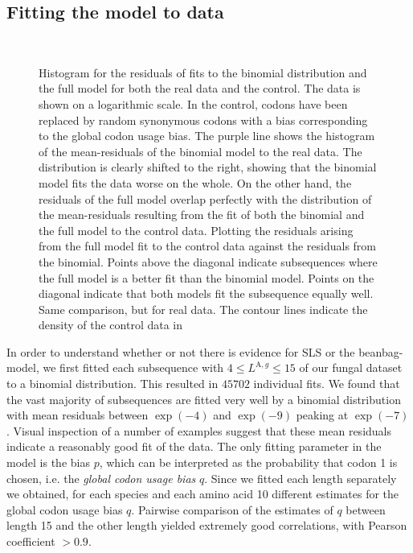\documentclass[a4paper,10pt]{paper}%
\begin{document}
\subsection{Fitting the model to data}
%
%
\begin{figure}
\centering
{}\\
\caption{ \protect{}  Histogram for the residuals  of fits to the binomial distribution and the full model for both the real data and the control. The data is shown on a logarithmic scale.  In the  control, codons have been replaced by random synonymous codons with a bias corresponding to the global codon usage bias.  The purple line shows the histogram of the mean-residuals of the binomial model to the real data.  The distribution is clearly shifted to the right, showing that  the binomial model fits the data  worse on the whole. On the other hand, the  residuals of the full model overlap perfectly with the distribution of the mean-residuals resulting from the fit  of both the binomial and the full model to the control data.  \protect{} Plotting the residuals arising from the full model fit to the control data against the residuals from the binomial. Points above the diagonal indicate subsequences where the full model is a better fit than the binomial model. Points on the diagonal indicate that both models fit the subsequence equally well. \protect{} Same comparison, but for real data. The contour lines indicate the density of the  control data in \protect{} }
\label{histogram}
\end{figure}
%
%  
In order to understand whether or not there is evidence for SLS or the beanbag-model, we first fitted  each subsequence  with $4\leq L^{\textrm{A},g}\leq 15$ of our fungal dataset  to a binomial distribution. This   resulted in  $45702$ individual fits.  We  found that the vast majority of subsequences are fitted very well by a binomial distribution with  mean residuals between $\exp(-4)$ and $\exp(-9)$ peaking at $\exp(-7)$. Visual inspection of a number of examples suggest that these mean residuals indicate a reasonably good fit of the data. The only fitting parameter in the model is the  bias $p$, which  can be interpreted as the probability that codon 1 is chosen,  i.e. the {\em global  codon usage bias} $q$.  Since we fitted each length separately we obtained, for each species and each amino acid 10 different estimates for the global codon usage bias  $q$.  Pairwise comparison of the estimates  of $q$ between length 15 and the other length yielded  extremely good correlations, with Pearson coefficient $> 0.9$. %
\end{document}
